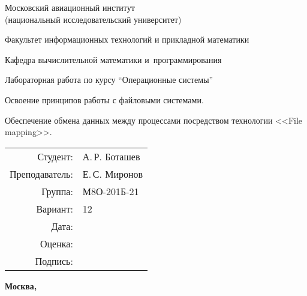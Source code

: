 \documentclass[pdf, unicode, 12pt, a4paper,oneside,fleqn]{article}
\begin{document}
\begin{titlepage}
    \begin{center}
        \bfseries

        {\Large Московский авиационный институт\\ (национальный исследовательский университет)}
        
        \vspace{48pt}
        
        {\large Факультет информационных технологий и прикладной математики}
        
        \vspace{36pt}
        
        {\large Кафедра вычислительной математики и~программирования}
        
        \vspace{48pt}
        
        Лабораторная работа  по курсу \enquote{Операционные системы}

        \vspace{48pt}

        Освоение принципов работы с файловыми системами. 
        
        Обеспечение обмена данных между процессами посредством технологии <<File mapping>>.
    \end{center}
    
    \vspace{125pt}
    
    \begin{flushright}
    \begin{tabular}{rl}
    Студент: & А.\,Р. Боташев \\
    Преподаватель: & Е.\,С. Миронов \\
    Группа: & М8О-201Б-21 \\
    Вариант: & 12 \\
    Дата: & \\
    Оценка: & \\
    Подпись: & \\
    \end{tabular}
    \end{flushright}
    
    \vfill
    
    \begin{center}
    \bfseries
    Москва, \the\year
    \end{center}
\end{titlepage}
    
\end{document}
